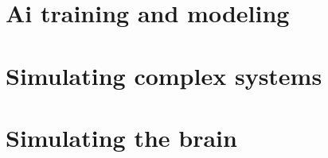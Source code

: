 \section{Ai training and modeling}
\section{Simulating complex systems}
\section{Simulating the brain}